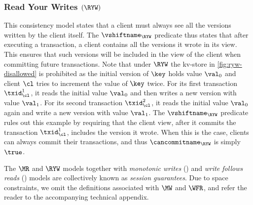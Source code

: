 \subsubsection{Read Your Writes $(\RYW)$}
This consistency model states that a client must always see all the versions written by the client itself. 
The $\vshiftname_{\RYW}$ predicate thus states that after executing a transaction, a client 
contains all the versions it wrote in its view. This ensures that such versions will be included in the view of the client 
when committing future transactions.
Note that under $\RYW$ the kv-store in \cref{fig:ryw-disallowed} is prohibited as
the initial version of $\key$ holds value $\val_0$ 
and client $\cl$ tries to increment the value of $\key$ twice.  
For its first transaction \( \txid_{\cl}^1\), it reads the initial value $\val_0$ and then writes a new version with value $\val_1$. 
For its second transaction \( \txid_{\cl}^2\), it reads the initial value $\val_0$ again and write a new version with value $\val_1$.
The $\vshiftname_{\RYW}$ predicate rules out this example by requiring that
the client view, after it commits the transaction  \(\txid_{\cl}^{1}\), includes the version it wrote.  
When this is the case, clients can always commit their transactions, and thus $\cancommitname_{\RYW}$ is simply $\true$.

The $\MR$ and $\RYW$ models together with \emph{monotonic writes} (\MW) and \emph{write follows reads} (\WFR) models  are collectively known as \emph{session guarantees}. 
Due to space constraints, we omit the definitions associated with $\MW$ and $\WFR$, and refer the reader to the accompanying technical appendix. 





